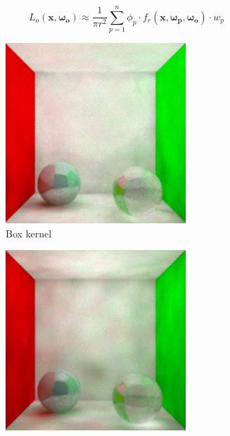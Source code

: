 \documentclass{article}
\begin{document}
\begin{equation}
L_o(\mathbf{x}, \mathbf{\omega_{o}}) \approx \frac{1}{\pi r^2} \sum_{p=1}^{n} \phi_{p} \cdot f_r(\mathbf{x}, \mathbf{\omega_{p}}, \mathbf{\omega_{o}}) \cdot w_p
\end{equation}

\begin{figure}
\begin{subfigure}[h]{0.32\linewidth}
\includegraphics[width=\linewidth]{imgs/box.png}
\caption{Box kernel}
\end{subfigure}
\hfill
\begin{subfigure}[h]{0.32\linewidth}
\includegraphics[width=\linewidth]{imgs/cone1.png}

\end{subfigure}
\end{figure}
\end{document}
